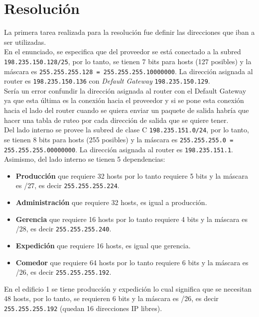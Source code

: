 \section{Resolución}

La primera tarea realizada para la resolución fue definir las direcciones que iban a ser utilizadas.\\

En el enunciado, se especifica que del proveedor se está conectado a la subred \texttt{198.235.150.128/25}, por lo tanto, se tienen 7 bits para hosts (127 posibles) y la máscara es \texttt{255.255.255.128 = 255.255.255.10000000}. La dirección asignada al router es \texttt{198.235.150.136} con \textit{Default Gateway} \texttt{198.235.150.129}.\\

Sería un error confundir la dirección asignada al router con el Default Gateway ya que esta última es la conexión hacia el proveedor y si se pone esta conexión hacia el lado del router cuando se quiera enviar un paquete de salida habría que hacer una tabla de ruteo por cada dirección de salida que se quiere tener.\\

Del lado interno se provee la subred de clase C \texttt{198.235.151.0/24}, por lo tanto, se tienen 8 bits para hosts (255 posibles) y la máscara es \texttt{255.255.255.0 = 255.255.255.00000000}. La dirección asignada al router es \texttt{198.235.151.1}.\\

Asimismo, del lado interno se tienen 5 dependencias:
\begin{itemize}
    \item \textbf{Producción} que requiere 32 hosts por lo tanto requiere 5 bits y la máscara es /27, es decir \texttt{255.255.255.224}.
    \item \textbf{Administración} que requiere 32 hosts, es igual a producción.
    \item \textbf{Gerencia} que requiere 16 hosts por lo tanto requiere 4 bits y la máscara es /28, es decir \texttt{255.255.255.240}.
    \item \textbf{Expedición} que requiere 16 hosts, es igual que gerencia.
    \item \textbf{Comedor} que requiere 64 hosts por lo tanto requiere 6 bits y la máscara es /26, es decir \texttt{255.255.255.192}.
\end{itemize}

En el edificio 1 se tiene producción y expedición lo cual significa que se necesitan 48 hosts, por lo tanto, se requieren 6 bits y la máscara es /26, es decir \texttt{255.255.255.192} (quedan 16 direcciones IP libres).\\

